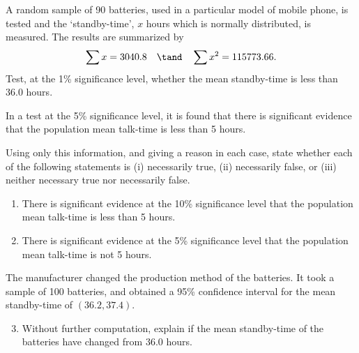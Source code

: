 \begin{problem}
    A random sample of 90 batteries, used in a particular model of mobile phone, is tested and the `standby-time', $x$ hours which is normally distributed, is measured. The results are summarized by \[\sum x=3040.8 \quad \tand \quad \sum x^{2}=115773.66.\] Test, at the 1\% significance level, whether the mean standby-time is less than 36.0 hours.

    In a test at the 5\% significance level, it is found that there is significant evidence that the population mean talk-time is less than 5 hours.

    Using only this information, and giving a reason in each case, state whether each of the following statements is (i) necessarily true, (ii) necessarily false, or (iii) neither necessary true nor necessarily false.

    \begin{enumerate}
        \item There is significant evidence at the 10\% significance level that the population mean talk-time is less than 5 hours.
        \item There is significant evidence at the 5\% significance level that the population mean talk-time is not 5 hours.
    \end{enumerate}
    
    The manufacturer changed the production method of the batteries. It took a sample of 100 batteries, and obtained a 95\% confidence interval for the mean standby-time of $(36.2, 37.4)$.

    \begin{enumerate}
        \setcounter{enumi}{2}
        \item Without further computation, explain if the mean standby-time of the batteries have changed from 36.0 hours.
    \end{enumerate}
\end{problem}

